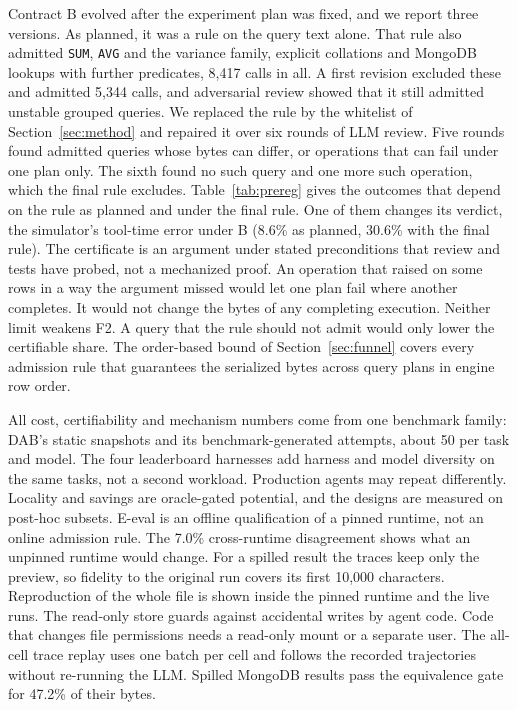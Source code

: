 Contract B evolved after the experiment plan was fixed, and we report three versions. As planned, it was a rule on
the query text alone. That rule also admitted \texttt{SUM}, \texttt{AVG} and the variance family, explicit
collations and MongoDB lookups with further predicates, 8,417 calls in all. A first revision excluded these and admitted 5,344 calls, and adversarial review showed that it still admitted unstable grouped queries. We replaced the rule by the whitelist of Section~\ref{sec:method} and repaired it over six rounds of LLM review. Five rounds found admitted queries whose bytes can
differ, or operations that can fail under one plan only. The sixth found no such query and one more such operation,
which the final rule excludes. Table~\ref{tab:prereg} gives the outcomes that depend on the rule as planned and
under the final rule. One of them changes its verdict, the simulator's tool-time error under B (8.6\% as planned,
30.6\% with the final rule). The certificate is an argument under stated preconditions that review and tests have
probed, not a mechanized proof. An operation that raised on some rows in a way the argument missed would let one
plan fail where another completes. It would not change the bytes of any completing execution. Neither limit weakens
F2. A query that the rule should not admit would only lower the certifiable share. The order-based bound of Section~\ref{sec:funnel} covers every admission rule that guarantees the serialized bytes across query plans in engine row order.

All cost, certifiability and mechanism numbers come from one benchmark family: DAB's static snapshots and its
benchmark-generated attempts, about 50 per task and model. The four leaderboard harnesses add harness and model diversity on the same tasks, not a second workload. Production agents may repeat differently. Locality and
savings are oracle-gated potential, and the designs are measured on post-hoc subsets. E-eval is an offline
qualification of a pinned runtime, not an online admission rule. The 7.0\% cross-runtime disagreement shows what an
unpinned runtime would change. For a spilled result the traces keep only the preview, so fidelity to the original
run covers its first 10,000 characters. Reproduction of the whole file is shown inside the pinned runtime and the
live runs.  The read-only store guards against accidental writes by agent
code. Code that changes file permissions needs a read-only mount or a separate user. The all-cell trace replay uses one batch per cell and follows the recorded trajectories without re-running the LLM. Spilled MongoDB results pass the equivalence gate for 47.2\% of their bytes. 

